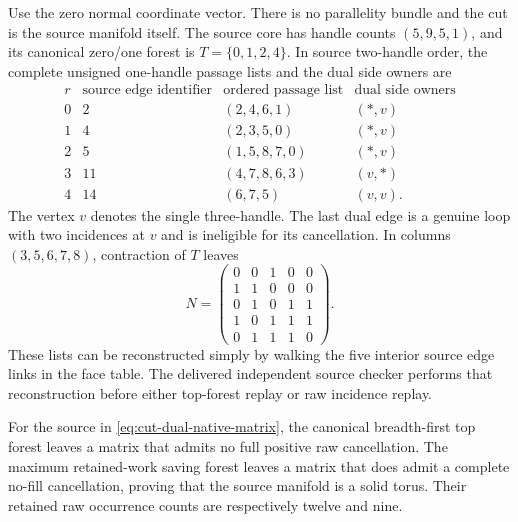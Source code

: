 Use the zero normal coordinate vector.  There is no parallelity bundle
and the cut is the source manifold itself.  The source core has handle
counts $(5,9,5,1)$, and its canonical zero/one forest is
$T=\{0,1,2,4\}$.  In source two-handle order, the complete unsigned
one-handle passage lists and the dual side owners are
\[
\begin{array}{c|c|c|c}
 r&\text{source edge identifier}&\text{ordered passage list}
     &\text{dual side owners}\\
 \hline
 0&2 &(2,4,6,1)&(\ast,v)\\
 1&4 &(2,3,5,0)&(\ast,v)\\
 2&5 &(1,5,8,7,0)&(\ast,v)\\
 3&11&(4,7,8,6,3)&(v,\ast)\\
 4&14&(6,7,5)&(v,v).
\end{array}
\]
The vertex $v$ denotes the single three-handle.  The last dual edge is
a genuine loop with two incidences at $v$ and is ineligible for its
cancellation.  In columns $(3,5,6,7,8)$, contraction of $T$ leaves
\begin{equation}
 N=\begin{pmatrix}
  0&0&1&0&0\\
  1&1&0&0&0\\
  0&1&0&1&1\\
  1&0&1&1&1\\
  0&1&1&1&0
 \end{pmatrix}.
 \label{eq:cut-dual-native-matrix}
\end{equation}
These lists can be reconstructed simply by walking the five interior
source edge links in the face table.  The delivered independent source
checker performs that reconstruction before either top-forest replay or
raw incidence replay.

\begin{proposition}
\label{prop:cut-dual-native-strict}
For the source in \eqref{eq:cut-dual-native-matrix}, the canonical
breadth-first top forest leaves a matrix that admits no full positive
raw cancellation.  The maximum retained-work saving forest leaves a
matrix that does admit a complete no-fill cancellation, proving that
the source manifold is a solid torus.  Their retained raw occurrence
counts are respectively twelve and nine.
\end{proposition}

